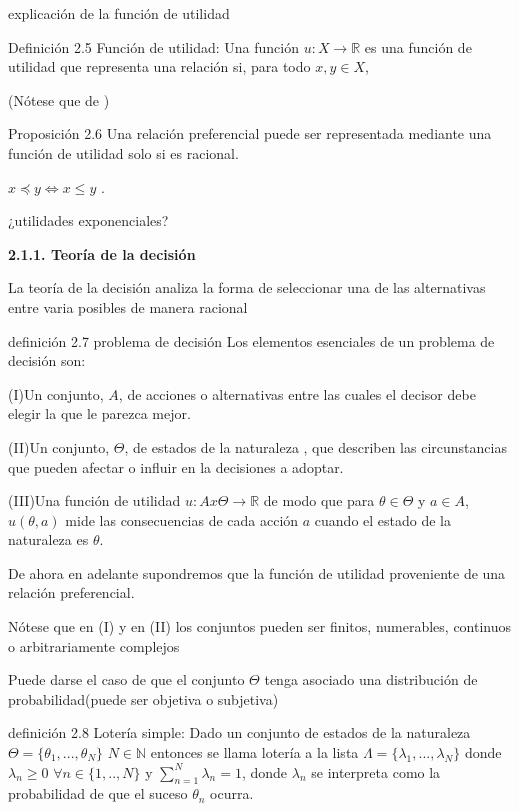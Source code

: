 \documentclass[11pt, a4paper]{article} %
\newcommand{\R}{\ensuremath{\mathbb{R}}}
\begin{document}
explicación de la función de utilidad

Definición 2.5 Función de utilidad: Una función $u:X \to \R$ es una función de utilidad que representa una relación si, para todo $x,y \in X$,

(Nótese que de  )


Proposición 2.6 
Una relación preferencial puede ser representada mediante una función de utilidad solo si es racional.

$x \preceq y \iff x \le y$ .

¿utilidades exponenciales?


{\bfseries \large 2.1.1. Teoría de la decisión} \vspace{5mm}

La teoría de la decisión analiza la forma de seleccionar una de las alternativas entre varia posibles de manera racional

definición 2.7 problema de decisión  
 Los elementos esenciales de un problema de decisión son:
  
  (I)Un conjunto, $A$, de acciones o alternativas entre las cuales el decisor debe elegir la que le parezca mejor.
  
  (II)Un conjunto, $\Theta$, de estados de la naturaleza , que describen las circunstancias que pueden afectar o influir en la decisiones a adoptar.
  
  (III)Una función de utilidad $u:Ax\Theta \to \R$ de modo que  para $\theta \in \Theta $ y $a \in A$, $u(\theta , a)$ mide las consecuencias de cada acción $a$ cuando el estado de la naturaleza es $\theta$.
   
De ahora en adelante supondremos que la función de utilidad proveniente de una relación preferencial.
 
Nótese que en (I) y en (II) los conjuntos pueden ser finitos, numerables, continuos o arbitrariamente complejos

Puede darse el caso de que el conjunto $\Theta$ tenga asociado una distribución de probabilidad(puede ser objetiva o subjetiva)

definición 2.8 Lotería simple: Dado un conjunto de estados de la naturaleza $\Theta =\{ \theta_1,...,\theta_N \} $ $N \in \mathbb{N}$ entonces se llama lotería a la lista $\Lambda =\{ \lambda_1,...,\lambda_N\} $ donde $\lambda_n \ge 0$ $\forall n \in \{ 1,..,N\} $ y $\sum_{n=1}^{N} \lambda_n=1$, donde $\lambda_n$ se interpreta como la probabilidad de que el suceso $\theta_n$ ocurra.
\end{document}
